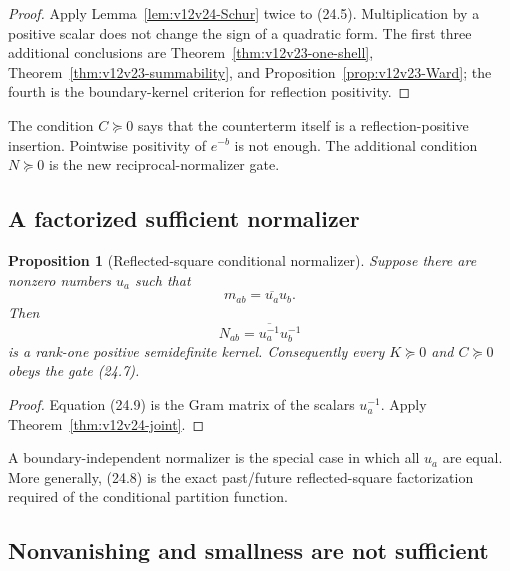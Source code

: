 \documentclass[11pt]{article}
\newtheorem{proposition}[theorem]{Proposition}
\theoremstyle{remark}
\begin{document}
\begin{proof}
Apply Lemma~\ref{lem:v12v24-Schur} twice to (24.5).
Multiplication by a positive scalar does not change the sign of a
quadratic form.  The first three additional conclusions are
Theorem~\ref{thm:v12v23-one-shell},
Theorem~\ref{thm:v12v23-summability}, and
Proposition~\ref{prop:v12v23-Ward}; the fourth is the boundary-kernel
criterion for reflection positivity.
\end{proof}

The condition \(C\succeq0\) says that the counterterm itself is a
reflection-positive insertion.  Pointwise positivity of
\(e^{-b}\) is not enough.  The additional condition \(N\succeq0\)
is the new reciprocal-normalizer gate.

\subsection{A factorized sufficient normalizer}

\begin{proposition}[Reflected-square conditional normalizer]
\label{prop:v12v24-factor}
Suppose there are nonzero numbers \(u_a\) such that
\[
                         m_{ab}=\overline{u_a}u_b.           \tag{24.8}
\]
Then
\[
                         N_{ab}
 =\overline{u_a^{-1}}u_b^{-1}                              \tag{24.9}
\]
is a rank-one positive semidefinite kernel.  Consequently every
\(K\succeq0\) and \(C\succeq0\) obeys the gate (24.7).
\end{proposition}

\begin{proof}
Equation (24.9) is the Gram matrix of the scalars \(u_a^{-1}\).
Apply Theorem~\ref{thm:v12v24-joint}.
\end{proof}

A boundary-independent normalizer is the special case in which all
\(u_a\) are equal.  More generally, (24.8) is the exact
past/future reflected-square factorization required of the
conditional partition function.

\subsection{Nonvanishing and smallness are not sufficient}
\end{document}
